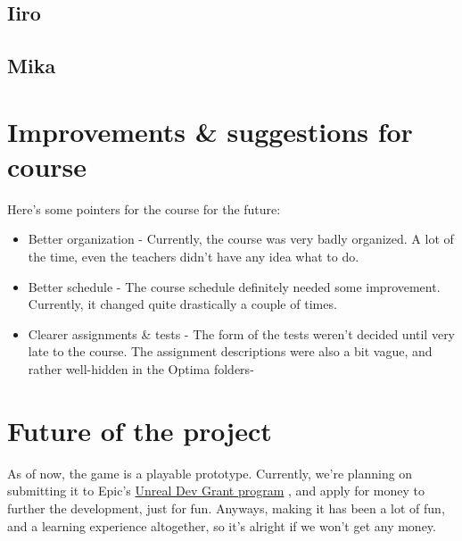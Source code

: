 \documentclass[
  oneside,
  11pt, a4paper,
  footinclude=true,
  headinclude=true,
  cleardoublepage=empty
]{scrbook}
\begin{document}
\section{Iiro}
\section{Mika}
\chapter{Improvements \& suggestions for course}
Here's some pointers for the course for the future:
\begin{itemize}
\item Better organization - Currently, the course was very badly organized. A lot of the time, even the teachers didn't have any idea what to do.

\item Better schedule - The course schedule definitely needed some improvement. Currently, it changed quite drastically a couple of times.

\item Clearer assignments \& tests - The form of the tests weren't decided until very late to the course. The assignment descriptions were also a bit vague, and rather well-hidden in the Optima folders-
\end{itemize}
\chapter{Future of the project}
As of now, the game is a playable prototype. Currently, we're planning on submitting it to Epic's \href{https://www.unrealengine.com/unrealdevgrants}{Unreal Dev Grant program} , and apply for money to further the development, just for fun. Anyways, making it has been a lot of fun, and a learning experience altogether, so it's alright if we won't get any money.
\end{document}
